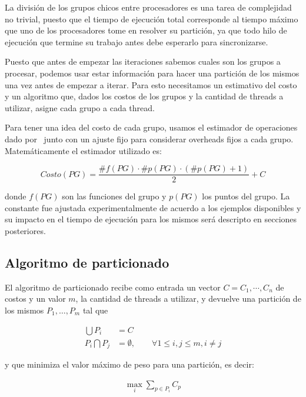 La divisi\'on de los grupos chicos entre procesadores es una tarea de complejidad
no trivial, puesto que el tiempo de ejecuci\'on total corresponde al tiempo m\'aximo
que uno de los procesadores tome en resolver su partici\'on, ya que todo hilo de 
ejecuci\'on que termine su trabajo antes debe esperarlo para sincronizarse.

Puesto que antes de empezar las iteraciones sabemos cuales son los grupos a 
procesar, podemos usar estar informaci\'on para hacer una partici\'on de los mismos
una vez antes de empezar a iterar. Para esto necesitamos un estimativo del costo
y un algoritmo que, dados los costos de los grupos y la cantidad de threads a 
utilizar, asigne cada grupo a cada thread.

Para tener una idea del costo de cada grupo, usamos el estimador de operaciones
dado por~\cite{LIO} junto con un ajuste fijo para considerar overheads fijos a 
cada grupo. Matem\'aticamente el estimador utilizado es:

\begin{equation}
    Costo(PG) = \frac{\#f(PG) \cdot \#p(PG) \cdot (\#p(PG) + 1)}{2} + C
\end{equation}

donde $f(PG)$ son las funciones del grupo y $p(PG)$ los puntos del grupo. La 
constante fue ajustada experimentalmente de acuerdo a los ejemplos disponibles y
su impacto en el tiempo de ejecuci\'on para los mismos ser\'a descripto en 
secciones posteriores.

\subsection{Algoritmo de particionado}

El algoritmo de particionado recibe como entrada un vector $C = {C_1, \cdots, C_n}$
de costos y un valor $m$, la cantidad de threads a utilizar, y devuelve una 
partici\'on de los mismos $P_1, \dots, P_m$ tal que

\begin{align}
    \bigcup P_i & = C \\
    P_i \bigcap P_j & = \emptyset, \qquad \forall 1 \leq i,j \leq m, i \neq j
    \label{eq:partition-conditions}
\end{align}

y que minimiza el valor m\'aximo de peso para una partici\'on, es decir:

\begin{align}
    \displaystyle \max_i \sum_{p \in P_i} C_p
\end{align}

